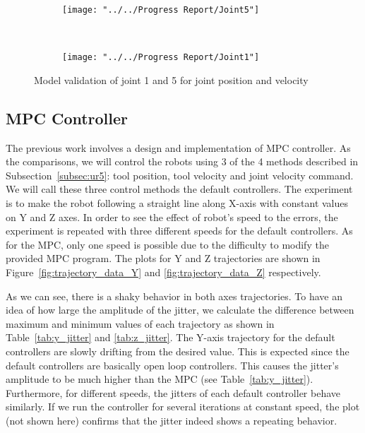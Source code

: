 \begin{figure}
	\centering
	\begin{subfigure}[b]{0.4\textwidth}
		\texttt{[image: "../../Progress Report/Joint5"]}
		\caption{}
		\label{fig:Joint5}
	\end{subfigure}%
	~ %
	\begin{subfigure}[b]{0.4\textwidth}
		\texttt{[image: "../../Progress Report/Joint1"]}
		\caption{}
		\label{fig:Joint1}
	\end{subfigure}
	\caption{Model validation of joint 1 and 5 for joint position and velocity}\label{fig:idenJoint}
\end{figure}

\newpage
\subsection{\ac{MPC} Controller}
The previous work involves a design and implementation of \ac {MPC} controller. As the comparisons, we will control the robots using 3 of the 4 methods described in Subsection~\ref{subsec:ur5}: tool position, tool velocity and joint velocity command. We will call these three control methods the default controllers. The experiment is to make the robot following a straight line along X-axis with constant values on Y and Z axes.  In order to see the effect of robot's speed to the errors, the experiment is repeated with three different speeds for the default controllers. As for the \ac {MPC}, only one speed is possible due to the difficulty to modify the provided \ac {MPC} program. The plots for Y and Z trajectories are shown in Figure~\ref{fig:trajectory_data_Y} and \ref{fig:trajectory_data_Z} respectively. 

As we can see, there is a shaky behavior in both axes trajectories. To have an idea of how large the amplitude of the jitter, we calculate the difference between maximum and minimum values of each trajectory as shown in Table~\ref{tab:y_jitter} and \ref{tab:z_jitter}. The Y-axis trajectory for the default controllers are slowly drifting from the desired value. This is expected since the default controllers are basically open loop controllers. This causes the jitter's amplitude to be much higher than the \ac {MPC} (see Table~\ref{tab:y_jitter}). Furthermore, for different speeds, the jitters of each default controller behave similarly. If we run the controller for several iterations at constant speed, the plot (not shown here) confirms that the jitter indeed shows a repeating behavior. 


